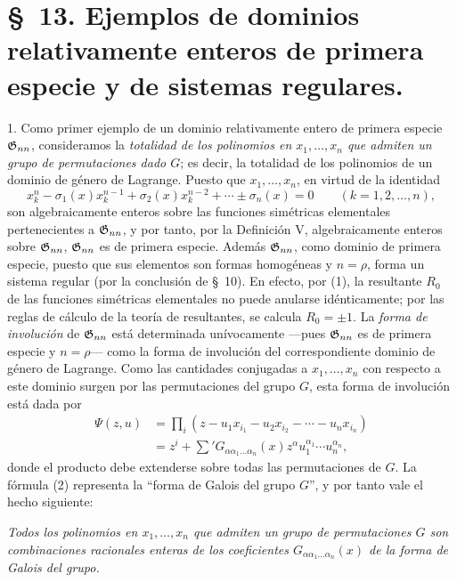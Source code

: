 \documentclass[11pt]{article}
\begin{document}
\section*{\S\ 13. Ejemplos de dominios relativamente enteros de primera especie y de sistemas regulares.}

1. Como primer ejemplo de un dominio relativamente entero de primera especie $\mathfrak{G}_{nn}$, consideramos la \emph{totalidad de los polinomios en $x_1,\ldots,x_n$ que admiten un grupo de permutaciones dado $G$}; es decir, la totalidad de los polinomios de un dominio de género de Lagrange. Puesto que $x_1,\ldots,x_n$, en virtud de la identidad
\begin{equation}
  x_k^n-\sigma_1(x)x_k^{n-1}+\sigma_2(x)x_k^{n-2}+\cdots\pm\sigma_n(x)=0
  \qquad(k=1,2,
\ldots,n),
\tag{1}
\end{equation}
son algebraicamente enteros sobre las funciones simétricas elementales pertenecientes a $\mathfrak{G}_{nn}$, y por tanto, por la Definición V, algebraicamente enteros sobre $\mathfrak{G}_{nn}$, $\mathfrak{G}_{nn}$ es de primera especie. Además $\mathfrak{G}_{nn}$, como dominio de primera especie, puesto que sus elementos son formas homogéneas y $n=\rho$, forma un sistema regular (por la conclusión de \S\ 10). En efecto, por (1), la resultante $R_0$ de las funciones simétricas elementales no puede anularse idénticamente; por las reglas de cálculo de la teoría de resultantes, se calcula $R_0=\pm1$. La \emph{forma de involución} de $\mathfrak{G}_{nn}$ está determinada unívocamente ---pues $\mathfrak{G}_{nn}$ es de primera especie y $n=\rho$--- como la forma de involución del correspondiente dominio de género de Lagrange. Como las cantidades conjugadas a $x_1,\ldots,x_n$ con respecto a este dominio surgen por las permutaciones del grupo $G$, esta forma de involución está dada por
\begin{equation}
\begin{aligned}
  \Psi(z,u)&=\prod_i
  (z-u_1x_{i_1}-u_2x_{i_2}-\cdots-u_nx_{i_n})\\
  &=z^i+\sum{}'G_{\alpha\alpha_1\ldots\alpha_n}(x)
  z^\alpha u_1^{\alpha_1}\cdots u_n^{\alpha_n},
\end{aligned}
\tag{2}
\end{equation}
donde el producto debe extenderse sobre todas las permutaciones de $G$. La fórmula (2) representa la ``forma de Galois del grupo $G$'', y por tanto vale el hecho siguiente:

\emph{Todos los polinomios en $x_1,\ldots,x_n$ que admiten un grupo de permutaciones $G$ son combinaciones racionales enteras de los coeficientes $G_{\alpha\alpha_1\ldots\alpha_n}(x)$ de la forma de Galois del grupo.}
\end{document}
